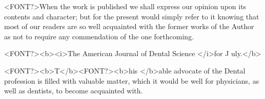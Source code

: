 <FONT?>When the work is published we shall express our opinion upon its
contents and character; but for the present would simply refer to it
knowing that most of our readers are so well acquainted with the former
works of the Author as not to require any commendation of the one
forthcoming.

<FONT?><b><i>The American Journal of Dental Science </i>for J uly.</b>

<FONT?><b>T</b><FONT?><b>his </b>able advocate of the Dental profession is filled with valuable
matter, which it would be well for physicians, as well as dentists, to
become acquainted with.\endinput
